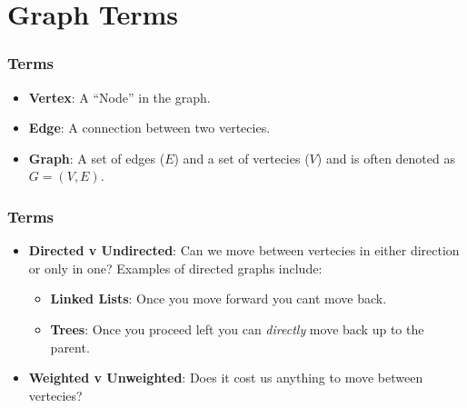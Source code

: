 \documentclass{beamer}
\begin{document}
\section{Graph Terms}
\begin{frame}[fragile]
	\frametitle{Terms}
    \centering
    \begin{minipage}{0.49\textwidth}
        \begin{figure}
            
        \end{figure}
    \end{minipage}
\vfill
	\begin{itemize}
		\item \textbf{Vertex}: A ``Node'' in the graph.
		\item \textbf{Edge}: A connection between two vertecies.
        \item \textbf{Graph}: A set of edges ($E$) and a set of vertecies ($V$) and is often denoted as $G = (V, E)$.
	\end{itemize}
\end{frame}

\begin{frame}[fragile]
	\frametitle{Terms}
    \centering
    \begin{minipage}{0.49\textwidth}
        \begin{figure}
            
        \end{figure}
    \end{minipage}
    \vfill
	\begin{itemize}
		\item \textbf{Directed v Undirected}: Can we move between vertecies in either direction or only in one? Examples of directed graphs include:
            \begin{itemize}
                \scriptsize
                \item \textbf{Linked Lists}: Once you move forward you cant move back.
                \item \textbf{Trees}: Once you proceed left you can \textit{directly} move back up to the parent.
            \end{itemize}
		\item \textbf{Weighted v Unweighted}: Does it cost us anything to move between vertecies?
	\end{itemize}
\end{frame}
\end{document}

